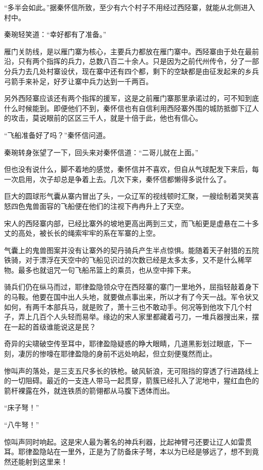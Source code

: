 “多半会如此。”据秦怀信所致，至少有六个村子不用经过西陉寨，就能从北侧进入村中。

秦琬轻笑道：“幸好都有了准备。”

雁门关防线，是以雁门寨为核心，主要兵力都放在雁门寨中。西陉寨由于处在最前沿，只有两个指挥的兵力，总数八百二十余人。只是因为之前代州传令，分了一部分兵力去几处村寨设伏，现在寨中还有四个都，剩下的空缺都是由征发起来的乡兵弓箭手来补足，好歹让寨中兵力达到一千两百。

另外西陉寨应该还有两个指挥的援军，这是之前雁门寨那里承诺过的，可不知到底什么时候能到。即便他们不到，秦怀信也有自信利用西陉寨外围的城防抵御下辽人的攻击，莫说眼前的区区三千人，就是十倍于此，他也有信心。

“飞船准备好了吗？”秦怀信问道。

秦琬转身张望了一下，回头来对秦怀信道：“二哥儿就在上面。”

但也没有说什么，脚不着地的感觉，秦怀信并不喜欢，但自从气球配发下来后，每一次启用，次子却总是争着上去。几次下来，秦怀信都懒得多说什么了。

巨大的圆球形气囊从寨内冒出了头，一众辽军的视线顿时汇聚，一艘绘制着哭笑喜怒四色鬼兽面容的飞船便在他们的注视下冉冉升上了天空。

宋人的西陉寨内部，已经比寨外的坡地更高出两到三丈，而飞船更是虚悬在二十多丈的高处，被长长的绳索牢牢的系在军寨的上空。

气囊上的鬼兽图案并没有让寨外的契丹骑兵产生半点惊惧。能随着天子射猎的五院铁骑，对于漂浮在天空中的飞船见识过的次数已经是太多太多，又不是什么稀罕物。最多也就诅咒一句飞船吊篮上的乘员，也从空中摔下来。

骑兵们仍在纵马而过，耶律盈隐领众守在西陉寨的寨门一里地外，屈指轻敲着身下的马鞍。他要在国中出人头地，就要做点事出来，所以才有了今天一战。军令状又如何，有两千本部兵马，就是败了，萧十三也不敢动手。何况等到他攻下几个村子，弄上几百个人头轻而易举。缘边的宋人家里都藏着弓刀，一堆兵器搜出来，摆在一起的首级谁能说这是民？

奇异的尖啸破空传至耳中，耶律盈隐疑惑的睁大眼睛，几道黑影划过眼底，下一刻，凄厉的惨嚎在耶律盈隐的身前不远处响起，但立刻便戛然而止。

惨叫声的落处，是三支五尺多长的铁枪。破风斩浪，无可阻挡的穿透了行进路线上的一切阻碍。最近的一支连人带马一起贯穿，箭簇已经扎入了泥地中，猩红血色的箭杆裸露在外，就连铁质的箭翎都从马腹下透体而出。

“床子弩！”

“八牛弩！”

惊叫声同时响起。这是宋人最为著名的神兵利器，比起神臂弓还要让辽人如雷贯耳。耶律盈隐站在一里外，正是为了防备床子弩，本以为已经是够远了，想不到竟然还能射到这里来！

